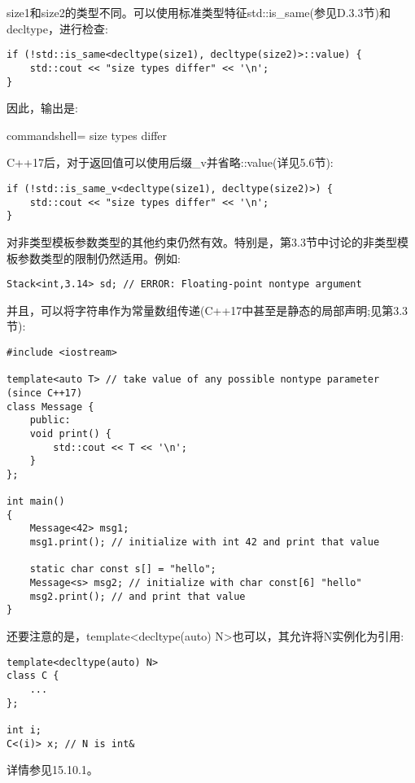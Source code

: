 size1和size2的类型不同。可以使用标准类型特征std::is\_same(参见D.3.3节)和decltype，进行检查:

\begin{lstlisting}[style=styleCXX]
if (!std::is_same<decltype(size1), decltype(size2)>::value) {
	std::cout << "size types differ" << '\n';
}
\end{lstlisting}

因此，输出是:

\begin{tcblisting}{commandshell={}}
size types differ
\end{tcblisting}

C++17后，对于返回值可以使用后缀\_v并省略::value(详见5.6节):

\begin{lstlisting}[style=styleCXX]
if (!std::is_same_v<decltype(size1), decltype(size2)>) {
	std::cout << "size types differ" << '\n';
}
\end{lstlisting}

对非类型模板参数类型的其他约束仍然有效。特别是，第3.3节中讨论的非类型模板参数类型的限制仍然适用。例如:

\begin{lstlisting}[style=styleCXX]
Stack<int,3.14> sd; // ERROR: Floating-point nontype argument
\end{lstlisting}

并且，可以将字符串作为常量数组传递(C++17中甚至是静态的局部声明;见第3.3节):

\begin{lstlisting}[style=styleCXX]
#include <iostream>

template<auto T> // take value of any possible nontype parameter (since C++17)
class Message {
	public:
	void print() {
		std::cout << T << '\n';
	}
};

int main()
{
	Message<42> msg1;
	msg1.print(); // initialize with int 42 and print that value
	
	static char const s[] = "hello";
	Message<s> msg2; // initialize with char const[6] "hello"
	msg2.print(); // and print that value
}
\end{lstlisting}

还要注意的是，template<decltype(auto) N>也可以，其允许将N实例化为引用:

\begin{lstlisting}[style=styleCXX]
template<decltype(auto) N>
class C {
	...
};

int i;
C<(i)> x; // N is int&
\end{lstlisting}

详情参见15.10.1。




